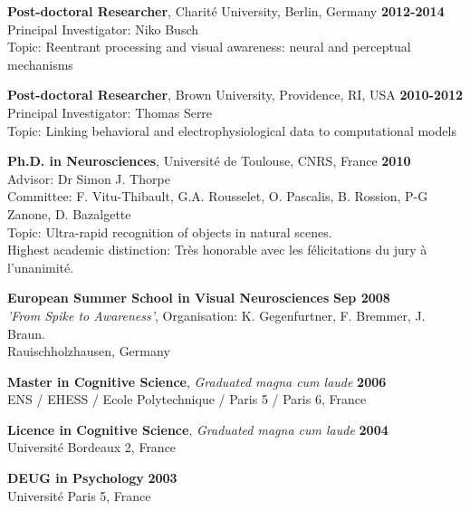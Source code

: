 \documentclass[margin,line]{resume}
\begin{document}
\begin{resume}
    	\textbf{Post-doctoral Researcher}, Charité University, Berlin, Germany \hfill \textbf{2012-2014}\\
    	Principal Investigator: Niko Busch\\
    	Topic: Reentrant processing and visual awareness: neural and perceptual mechanisms 
	\vspace{-1.5mm}
	
	\textbf{Post-doctoral Researcher}, Brown University, Providence, RI, USA \hfill \textbf{2010-2012}\\
	Principal Investigator: Thomas Serre\\
	Topic: Linking behavioral and electrophysiological data to computational models
	\vspace{-1.5mm}
	
    \textbf{Ph.D. in Neurosciences}, Université de Toulouse, CNRS, France \hfill \textbf{2010}\\
	Advisor:  Dr Simon J. Thorpe\\
	Committee: F. Vitu-Thibault, G.A. Rousselet, O. Pascalis, B. Rossion, P-G Zanone, D. Bazalgette\\
	Topic: Ultra-rapid recognition of objects in natural scenes.\\
	Highest academic distinction: Très honorable avec les félicitations du jury à l'unanimité.
	\vspace{-1.5mm}

	\textbf{European Summer School in Visual Neurosciences} \hfill \textbf{Sep 2008}\\
	\textsl{'From Spike to Awareness'}, Organisation: K. Gegenfurtner, F. Bremmer, J. Braun.\\
	Rauischholzhausen, Germany
	\vspace{-1.5mm}

	\textbf{Master in Cognitive Science}, \textsl{Graduated magna cum laude} \hfill \textbf{2006}\\
	ENS / EHESS / Ecole Polytechnique / Paris 5 / Paris 6, France
	\vspace{-1.5mm}

	\textbf{Licence in Cognitive Science}, \textsl{Graduated magna cum laude} \hfill \textbf{2004}\\
	Université Bordeaux 2, France
	\vspace{-1.5mm}
	
	\textbf{DEUG in Psychology} \hfill \textbf{2003}\\
	Université Paris 5, France
	\vspace{-1.5mm}
	

\end{resume}
\end{document}
